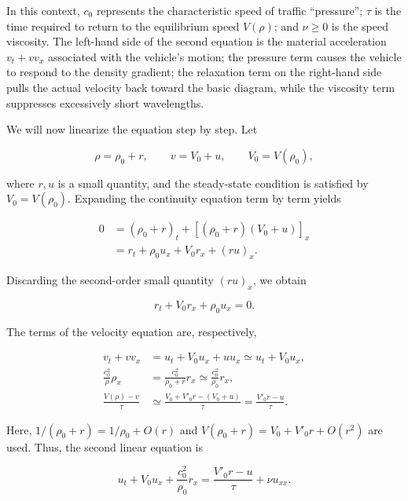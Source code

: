 \documentclass[11pt,a4paper,openany]{book}
\numberwithin{equation}{chapter}
\numberwithin{figure}{chapter}
\numberwithin{table}{chapter}
\begin{document}
In this context, $c_0$ represents the characteristic speed of traffic “pressure”; $\tau$ is the time required to return to the equilibrium speed $V(\rho)$; and $\nu\ge0$ is the speed viscosity. The left-hand side of the second equation is the material acceleration $v_t+vv_x$ associated with the vehicle’s motion; the pressure term causes the vehicle to respond to the density gradient; the relaxation term on the right-hand side pulls the actual velocity back toward the basic diagram, while the viscosity term suppresses excessively short wavelengths.




We will now linearize the equation step by step. Let

\begin{equation}
\rho=\rho_0+r,
\qquad v=V_0+u,
\qquad V_0=V(\rho_0),
\label{eq:pw-perturbation}
\end{equation}

where $r,u$ is a small quantity, and the steady-state condition is satisfied by $V_0=V(\rho_0)$. Expanding the continuity equation term by term yields

\begin{align}
0&=(\rho_0+r)_t+[(\rho_0+r)(V_0+u)]_x\\
 &=r_t+\rho_0u_x+V_0r_x+(ru)_x.
\end{align}

Discarding the second-order small quantity $(ru)_x$, we obtain

\begin{equation}
r_t+V_0r_x+\rho_0u_x=0.
\label{eq:pw-linear-continuity}
\end{equation}

The terms of the velocity equation are, respectively,

\begin{align}
v_t+vv_x&=u_t+V_0u_x+uu_x
          \simeq u_t+V_0u_x,\\
\frac{c_0^2}{\rho}\rho_x
&=\frac{c_0^2}{\rho_0+r}r_x
 \simeq \frac{c_0^2}{\rho_0}r_x,\\
\frac{V(\rho)-v}{\tau}
&\simeq\frac{V_0+V'_0r-(V_0+u)}{\tau}
=\frac{V'_0r-u}{\tau}.
\end{align}

Here, $1/(\rho_0+r)=1/\rho_0+O(r)$ and $V(\rho_0+r)=V_0+V'_0r+O(r^2)$ are used. Thus, the second linear equation is

\begin{equation}
u_t+V_0u_x+\frac{c_0^2}{\rho_0}r_x
=\frac{V'_0r-u}{\tau}+\nu u_{xx}.
\label{eq:pw-linear-speed}
\end{equation}
\end{document}
